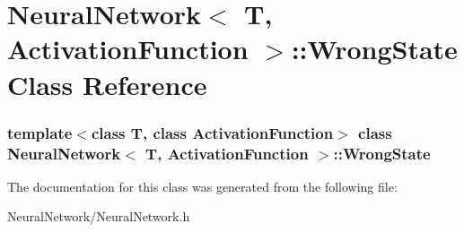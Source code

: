 \hypertarget{class_neural_network_1_1_wrong_state}{\section{\-Neural\-Network$<$ \-T, \-Activation\-Function $>$\-:\-:\-Wrong\-State \-Class \-Reference}
\label{class_neural_network_1_1_wrong_state}
}
\subsubsection*{template$<$class T, class Activation\-Function$>$ class Neural\-Network$<$ T, Activation\-Function $>$\-::\-Wrong\-State}



\-The documentation for this class was generated from the following file\-:\begin{DoxyCompactItemize}
\item 
\-Neural\-Network/\-Neural\-Network.\-h\end{DoxyCompactItemize}
